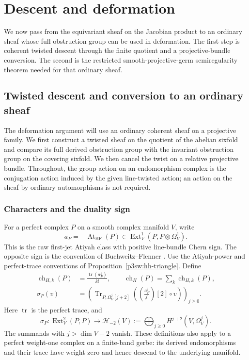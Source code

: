 \documentclass[11pt]{article}
\numberwithin{equation}{section}
\begin{document}
\section{Descent and deformation}
\label{p3:sec:deformation}

We now pass from the equivariant sheaf on the Jacobian product to an
ordinary sheaf whose full obstruction group can be used in deformation.
The first step is coherent twisted descent through the finite quotient and
a projective-bundle conversion. The second is the restricted
smooth-projective-germ semiregularity theorem needed for that ordinary
sheaf.

\subsection{Twisted descent and conversion to an ordinary sheaf}
\label{p3sw:descent-section}

The deformation argument will use an ordinary coherent sheaf on a
projective family.  We first construct a twisted sheaf on the quotient of
the abelian sixfold and compare its full derived obstruction group with
the invariant obstruction group on the covering sixfold.  We then cancel
the twist on a relative projective bundle.  Throughout, the group action
on an endomorphism complex is the conjugation action induced by the given
line-twisted action; an action on the sheaf by ordinary automorphisms is
not required.

\subsubsection{Characters and the duality sign}

For a perfect complex \(P\) on a smooth complex manifold \(V\), write
\[
 a_P=-\operatorname{At}_{\mathrm{BF}}(P)
       \in\operatorname{Ext}^1_V(P,P\otimes\Omega_V^1).
\]
This is the raw first-jet Atiyah class with positive line-bundle Chern
sign.  The opposite sign is the convention of
Buchweitz--Flenner \cite[Definition~3.4 and Definition~4.1]{P3SWBuchweitzFlenner2003}.
Use the Atiyah-power and perfect-trace conventions of
Proposition~\ref{p3sw:hh-triangle}.  Define
\begin{equation}
\label{p3sw:descent-character}
 \begin{aligned}
 \operatorname{ch}_{H,k}(P)&=\frac{\operatorname{tr}(a_P^k)}{k!},
 \qquad
 \operatorname{ch}_H(P)=\sum_k\operatorname{ch}_{H,k}(P),\\
 \sigma_P(v)&=
 \left(\operatorname{Tr}_{P,\Omega_V^j[j+2]}
   \left(\left(\frac{a_P^j}{j!}\right)[2]\circ v\right)\right)_{j\geq0}.
 \end{aligned}
\end{equation}
Here \(\operatorname{tr}\) is the perfect trace, and
\[
 \sigma_P:\operatorname{Ext}^2_V(P,P)\longrightarrow
 \mathcal H_{-2}(V):=\bigoplus_{j\geq0}H^{j+2}(V,\Omega_V^j).
\]
The summands with \(j>\dim V-2\) vanish.  These definitions also apply to
a perfect weight-one complex on a finite-band gerbe: its derived
endomorphisms and their trace have weight zero and hence descend to the
underlying manifold.
\end{document}
